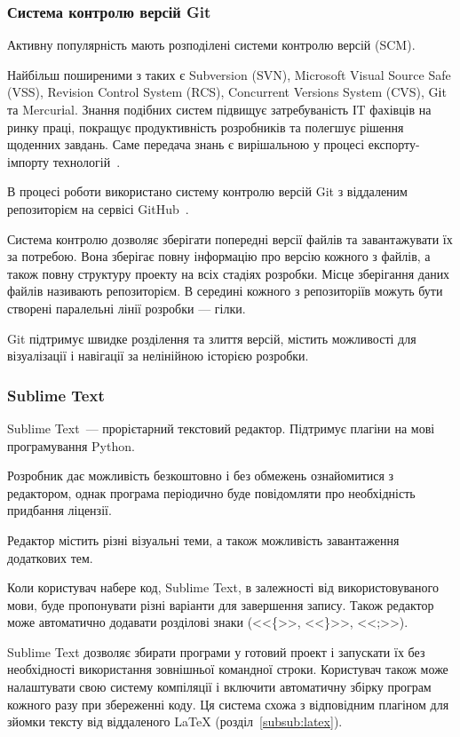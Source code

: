 \subsubsection{Система контролю версій Git}

Активну популярність мають розподілені системи контролю версій (SCM).

Найбільш поширеними з таких є Subversion (SVN), Microsoft Visual Source Safe (VSS), Revision Control System (RCS), Concurrent Versions System (CVS), Gіt та Mercurіal. Знання подібних систем підвищує затребуваність ІT фахівців на ринку праці, покращує продуктивність розробників та полегшує рішення щоденних завдань. Саме передача знань є вирішальною у процесі експорту-імпорту технологій~\cite{киричек2012модель}.

В процесі роботи використано систему контролю версій Git з віддаленим репозиторієм на сервісі GitHub~\cite{gCalShedule}.

Система контролю дозволяє зберігати попередні версії файлів та завантажувати їх за потребою. Вона зберігає повну інформацію про версію кожного з файлів, а також повну структуру проекту на всіх стадіях розробки. Місце зберігання даних файлів називають репозиторієм. В середині кожного з репозиторіїв можуть бути створені паралельні лінії розробки — гілки.

Git підтримує швидке розділення та злиття версій, містить можливості для візуалізації і навігації за нелінійною історією розробки. 

\subsubsection{Sublime Text}

Sublime Text~--- прорієтарний текстовий редактор. Підтримує плагіни на мові програмування Python.

Розробник дає можливість безкоштовно і без обмежень ознайомитися з редактором, однак програма періодично буде повідомляти про необхідність придбання ліцензії.

Редактор містить різні візуальні теми, а також можливість завантаження додаткових тем.

Коли користувач набере код, Sublime Text, в залежності від використовуваного мови, буде пропонувати різні варіанти для завершення запису. Також редактор може автоматично додавати розділові знаки (<<\{>>, <<\}>>, <<;>>).

Sublime Text дозволяє збирати програми у готовий проект і запускати їх без необхідності використання зовнішньої командної строки. Користувач також може налаштувати свою систему компіляції і включити автоматичну збірку програм кожного разу при збереженні коду. Ця система схожа з відповідним плагіном для зйомки тексту від віддаленого LaTeX (розділ~\ref{subsub:latex}).

